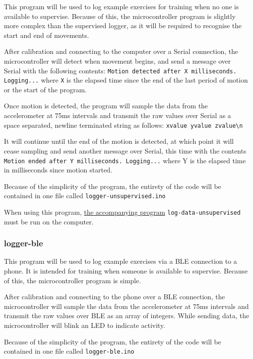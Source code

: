 \documentclass[a4paper]{article}
\begin{document}
This program will be used to log example exercises for training when no one is available to supervise. Because of this, the microcontroller program is slightly more complex than the supervised logger, as it will be required to recognise the start and end of movements.

After calibration and connecting to the computer over a Serial connection, the microcontroller will detect when movement begins, and send a message over Serial with the following contents: \lstinline{Motion detected after X milliseconds. Logging...} where \lstinline{X} is the elapsed time since the end of the last period of motion or the start of the program.

Once motion is detected, the program will sample the data from the accelerometer at 75ms intervals and transmit the raw values over Serial as a space separated, newline terminated string as follows:
\lstinline|xvalue yvalue zvalue\n|

It will continue until the end of the motion is detected, at which point it will cease sampling and send another message over Serial, this time with the contents \lstinline{Motion ended after Y milliseconds. Logging...} where Y is the elapsed time in milliseconds since motion started.

Because of the simplicity of the program, the entirety of the code will be contained in one file called \lstinline{logger-unsupervised.ino}

When using this program, \hyperref[subsubsec:dc_csa_logunsupervised]{the accompanying program} \lstinline{log-data-unsupervised} must be run on the computer.

\subsubsection{logger-ble}%
\label{subsubsec:dc_msa_loggerble}

This program will be used to log example exercises via a BLE connection to a phone. It is intended for training when someone is available to supervise. Because of this, the microcontroller program is simple.

After calibration and connecting to the phone over a BLE connection, the microcontroller will sample the data from the accelerometer at 75ms intervals and transmit the raw values over BLE as an array of integers.
While sending data, the microcontroller will blink an LED to indicate activity.

Because of the simplicity of the program, the entirety of the code will be contained in one file called \lstinline{logger-ble.ino}
\end{document}
